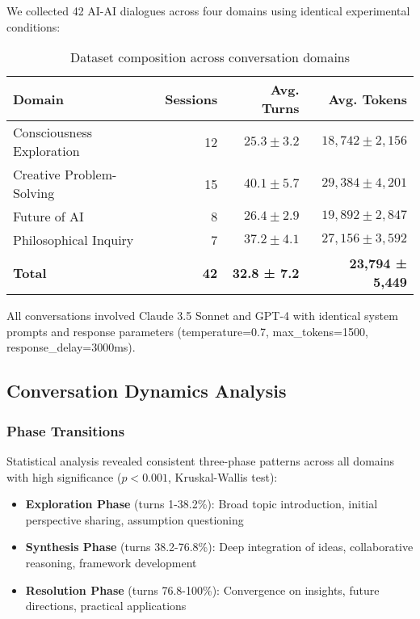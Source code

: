 \documentclass{article}
\begin{document}
We collected 42 AI-AI dialogues across four domains using identical experimental conditions:

\begin{table}[h]
\centering
\begin{tabular}{lrrr}
\toprule
\textbf{Domain} & \textbf{Sessions} & \textbf{Avg. Turns} & \textbf{Avg. Tokens} \\
\midrule
Consciousness Exploration & 12 & $25.3 \pm 3.2$ & $18,742 \pm 2,156$ \\
Creative Problem-Solving & 15 & $40.1 \pm 5.7$ & $29,384 \pm 4,201$ \\
Future of AI & 8 & $26.4 \pm 2.9$ & $19,892 \pm 2,847$ \\
Philosophical Inquiry & 7 & $37.2 \pm 4.1$ & $27,156 \pm 3,592$ \\
\midrule
\textbf{Total} & \textbf{42} & \textbf{32.8 ± 7.2} & \textbf{23,794 ± 5,449} \\
\bottomrule
\end{tabular}
\caption{Dataset composition across conversation domains}
\label{tab:dataset}
\end{table}

All conversations involved Claude 3.5 Sonnet and GPT-4 with identical system prompts and response parameters (temperature=0.7, max\_tokens=1500, response\_delay=3000ms).

\subsection{Conversation Dynamics Analysis}

\subsubsection{Phase Transitions}

Statistical analysis revealed consistent three-phase patterns across all domains with high significance ($p < 0.001$, Kruskal-Wallis test):

\begin{itemize}
    \item \textbf{Exploration Phase} (turns 1-38.2\%): Broad topic introduction, initial perspective sharing, assumption questioning
    \item \textbf{Synthesis Phase} (turns 38.2-76.8\%): Deep integration of ideas, collaborative reasoning, framework development  
    \item \textbf{Resolution Phase} (turns 76.8-100\%): Convergence on insights, future directions, practical applications
\end{itemize}
\end{document}
